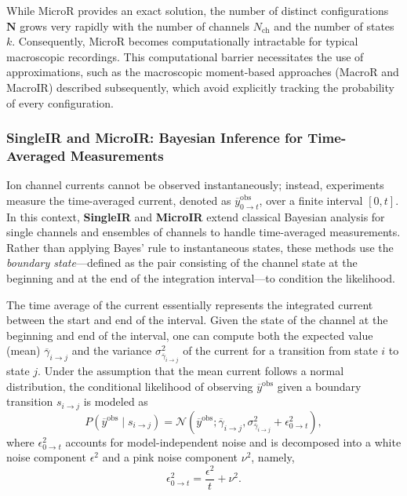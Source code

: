 \documentclass[pdflatex,sn-nature]{sn-jnl}%
\begin{document}
While MicroR provides an exact solution, the number of distinct configurations \( \boldsymbol{N} \) grows very rapidly with the number of channels \( N_{\text{ch}} \) and the number of states \(k\). Consequently, MicroR becomes computationally intractable for typical macroscopic recordings. This computational barrier necessitates the use of approximations, such as the macroscopic moment-based approaches (MacroR and MacroIR) described subsequently, which avoid explicitly tracking the probability of every configuration.

\subsubsection{SingleIR and MicroIR: Bayesian Inference for Time-Averaged Measurements}

Ion channel currents cannot be observed instantaneously; instead, experiments measure the time-averaged current, denoted as $\overline{y}^{\text{obs}}_{0 \rightarrow t}$, over a finite interval $[0,t]$. In this context, \textbf{SingleIR} and \textbf{MicroIR} extend classical Bayesian analysis for single channels and ensembles of channels to handle time-averaged measurements. Rather than applying Bayes' rule to instantaneous states, these methods use the \emph{boundary state}—defined as the pair consisting of the channel state at the beginning and at the end of the integration interval—to condition the likelihood.

The time average of the current essentially represents the integrated current between the start and end of the interval. Given the state of the channel at the beginning and end of the interval, one can compute both the expected value (mean) $\overline{\gamma}_{i\rightarrow j}$ and the variance $\sigma^2_{\overline{\gamma}_{i\rightarrow j}}$ of the current for a transition from state $i$ to state $j$. Under the assumption that the mean current follows a normal distribution, the conditional likelihood of observing $\overline{y}^{\text{obs}}$ given a boundary transition $s_{i\rightarrow j}$ is modeled as
\[
P\left(\overline{y}^{\text{obs}} \mid s_{i\rightarrow j}\right) = \mathcal{N}\left(\overline{y}^{\text{obs}}; \overline{\gamma}_{i\rightarrow j}, \sigma^2_{\overline{\gamma}_{i\rightarrow j}} + \epsilon^2_{0 \rightarrow t}\right),
\]
where $\epsilon^2_{0 \rightarrow t}$ accounts for model-independent noise and is decomposed into a white noise component $\epsilon^2$ and a pink noise component $\nu^2$, namely,
\begin{equation}
	\epsilon ^2_{0 \rightarrow t} = \frac{\epsilon^2}{t} + \nu ^2.
	\label{eq:interval_noise}
\end{equation}
\end{document}
